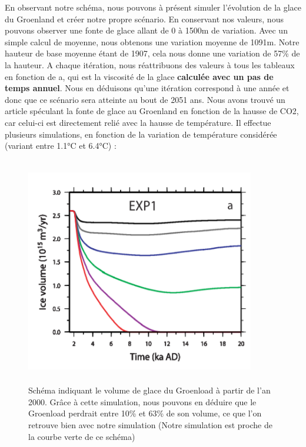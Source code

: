 \documentclass{article}
\begin{document}
En observant notre schéma, nous pouvons à présent simuler l'évolution de la glace du Groenland et créer notre propre scénario. En conservant nos valeurs, nous pouvons observer une fonte de glace allant de 0 à 1500m de variation. Avec un simple calcul de moyenne, nous obtenons une variation moyenne de 1091m. Notre hauteur de base moyenne étant de 1907, cela nous donne une variation de 57\% de la hauteur. A chaque itération, nous réattribuons des valeurs à tous les tableaux en fonction de a, qui est la viscosité de la glace \textbf{calculée avec un pas de temps annuel}. Nous en déduisons qu'une itération correspond à une année et donc que ce scénario sera atteinte au bout de 2051 ans. 
\newpage
Nous avons trouvé un article \cite{charbit2008amount} spéculant la fonte de glace au Groenland en fonction de la hausse de CO2, car celui-ci est directement relié avec la hausse de température. Il effectue plusieurs simulations, en fonction de la variation de température considérée (variant entre 1.1°C et 6.4°C) : 
\begin{figure}[!htpb]
\centering
\includegraphics[width=10cm, keepaspectratio=true, height=10cm]{Variation.png}
\caption{Schéma indiquant le volume de glace du Groenload à partir de l'an 2000. Grâce à cette simulation, nous pouvons en déduire que le Groenload perdrait entre 10\% et 63\% de son volume, ce que l'on retrouve bien avec notre simulation (Notre simulation est proche de la courbe verte de ce schéma) }
\end{figure}
\newpage




\end{document}
